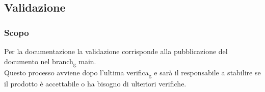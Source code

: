     \subsection{Validazione}
        \subsubsection{Scopo}
        Per la documentazione la validazione corrisponde alla pubblicazione del documento nel branch\textsubscript{g} main.\\
        Questo processo avviene dopo l'ultima verifica\textsubscript{g} e sarà il responsabile a stabilire se il prodotto è accettabile o ha bisogno di
        ulteriori verifiche.
